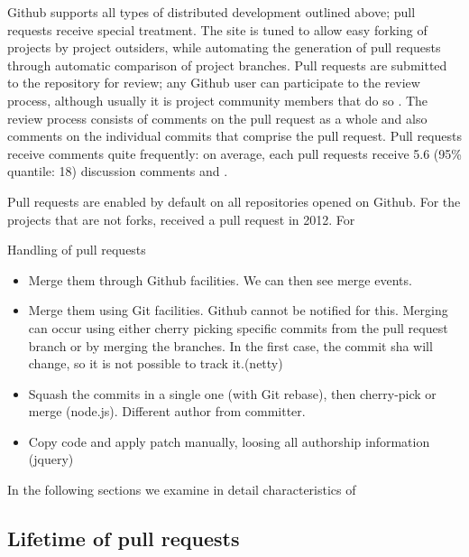 \documentclass{sig-alternate}
\begin{document}
Github supports all types of distributed development outlined above;
pull requests receive special treatment. The site is tuned to allow easy forking
of projects by project outsiders, while automating the generation of pull
requests through automatic comparison of project branches. Pull requests are
submitted to the repository for review; any Github user can participate to the
review process, although usually it is project community members that do so
. The
review process consists of comments on the pull request as a whole and also
comments on the individual commits that comprise the pull request.
Pull requests receive comments quite frequently: on average, each pull
requests receive 5.6 (95\% quantile: 18) discussion comments and .

Pull requests are enabled by default on all repositories opened on Github.
For the projects that are not forks, 
received a pull request in 2012. For 

Handling of pull requests

\begin{itemize}

  \item Merge them through Github facilities. We can then see merge events.

  \item  Merge them using Git facilities. Github cannot be notified for this. Merging can occur using either cherry picking specific commits from the pull request branch or by merging the branches. In the first case, the commit sha will change, so it is not possible to track it.(netty)

  \item Squash the commits in a single one (with Git rebase), then cherry-pick or merge (node.js). Different author from committer. 

  \item Copy code and apply patch manually, loosing all authorship information
    (jquery)

\end{itemize}

In the following sections we examine in detail characteristics of 

\subsection{Lifetime of pull requests}
\end{document}
